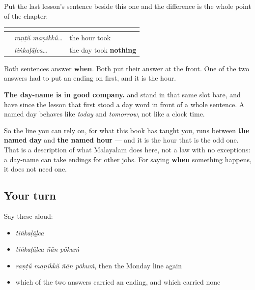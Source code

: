 \begin{grammarlens}[title={Grammar Lens: two words, one slot, one ending between them}]
Put the last lesson's sentence beside this one and the difference is the whole point of the chapter:

\noindent
\begin{tabularx}{\linewidth}{@{}>{\raggedright\arraybackslash}X>{\raggedright\arraybackslash}X>{\raggedright\arraybackslash}X@{}}
\toprule
\textbf{} & \textbf{} & \textbf{} \\
\midrule
\textbf{\ml{രണ്ട്} \ml{മണിക്ക്} \ml{ഞാൻ} \ml{പോകും}} & \emph{raṇṭŭ maṇikkŭ…} & the hour took \textbf{\ml{ക്ക്}} \\
\textbf{\ml{തിങ്കളാഴ്ച} \ml{ഞാൻ} \ml{പോകും}} & \emph{tiṅkaḷāḻca…} & the day took \textbf{nothing} \\
\bottomrule
\end{tabularx}

Both sentences answer \textbf{when}. Both put their answer at the front. One of the two answers had to put an ending on first, and it is the hour.
\end{grammarlens}

\begin{culture}
\textbf{The day-name is in good company.} \textbf{} and \textbf{} stand in that same slot bare, and have since the lesson that first stood a day word in front of a whole sentence. A named day behaves like \emph{today} and \emph{tomorrow}, not like a clock time.

So the line you can rely on, for what this book has taught you, runs between \textbf{the named day} and \textbf{the named hour} — and it is the hour that is the odd one. That is a description of what Malayalam does here, not a law with no exceptions: a day-name can take endings for other jobs. For saying \textbf{when} something happens, it does not need one.
\end{culture}

\subsection*{Your turn}
Say these aloud:

\begin{itemize}
\raggedright
  \item \emph{tiṅkaḷāḻca}
  \item \emph{tiṅkaḷāḻca ñān pōkuṁ}
  \item \emph{raṇṭŭ maṇikkŭ ñān pōkuṁ}, then the Monday line again
  \item which of the two answers carried an ending, and which carried none
\end{itemize}

